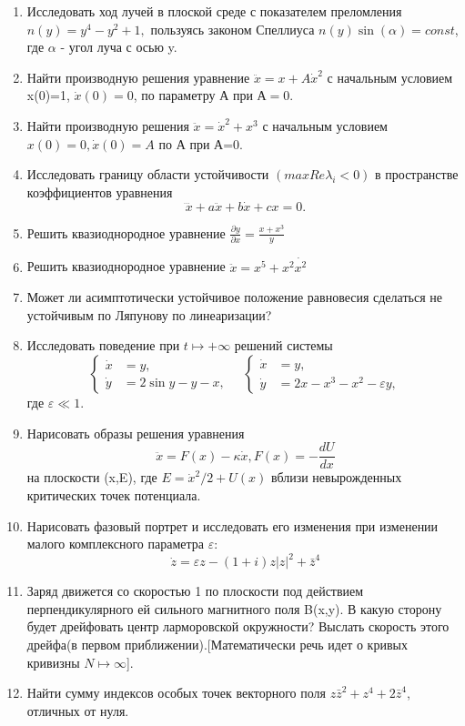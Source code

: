 \documentclass{article}
\begin{document}
\begin{enumerate}
\item Исследовать ход лучей в плоской среде с показателем преломления $n(y)=y^{4}-y^{2}+1,$ пользуясь законом Спеллиуса $n(y)\sin(\alpha)=const$, где $\alpha$ - угол луча с осью y.
\item Найти производную решения уравнение $\ddot{x}=x+A\dot{x}^{2}$ с начальным условием x(0)=1, $\dot{x}(0)=0$, по параметру А при $А=0$.
\item Найти производную решения $\ddot{x}=\dot{x}^{2}+x^{3}$ с начальным условием \\ $x(0)=0,\dot{x}(0)=A$ по А при А=0.
\item Исследовать границу области устойчивости $(max Re\lambda_{i}<0)$ в пространстве коэффициентов уравнения $$\dddot{x}+a\ddot{x}+b\dot{x}+cx=0.$$
\item Решить квазиоднородное уравнение  $\frac{\partial{y}}{\partial{x}}=\frac{x+x^{3}}{y}$
\item Решить квазиоднородное уравнение $\ddot{x}=x^{5}+x^{2}\dot{x^{2}}$
\item Может ли асимптотически устойчивое положение равновесия сделаться не устойчивым по Ляпунову по линеаризации?
\item Исследовать поведение при $t\mapsto +\infty$ решений системы 
$$\begin{cases}                             
\dot{x} &= y, \\                       
\dot{y} &= 2\sin y-y-x,               
\end{cases}  \quad                        
\begin{cases}
\dot{x} &= y, \\
\dot{y} &= 2x-x^{3}-x^{2}-\varepsilon y,
\end{cases}$$
где $\varepsilon\ll1.$
\item Нарисовать образы решения уравнения $$\ddot{x}=F(x)-\kappa\dot{x}, F(x)=-\frac{dU}{dx}$$ на плоскости (x,E), где $E=\dot{x}^{2}/2+U(x)$ вблизи невырожденных критических точек потенциала.
\item Нарисовать фазовый портрет и исследовать его изменения при изменении малого комплексного параметра $\varepsilon$: $$\dot{z}=\varepsilon z-(1+i)z|z|^{2}+\bar{z}^{4}$$
\item Заряд движется со скоростью 1 по плоскости под действием перпендикулярного ей сильного магнитного поля B(x,y). В какую сторону будет дрейфовать центр ларморовской окружности? Выслать скорость этого дрейфа(в первом приближении).[Математически речь идет о кривых кривизны $N\mapsto\infty$].
\item Найти сумму индексов особых точек векторного поля $z\bar{z}^{2}+z^{4}+2\bar{z}^{4}$, отличных от нуля.

\end{enumerate}
\end{document}

